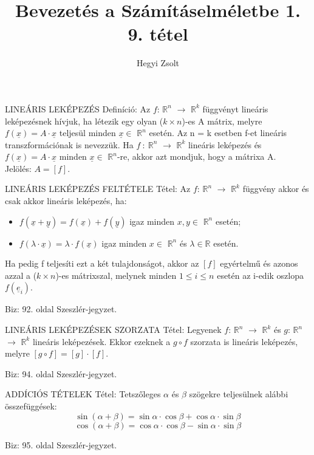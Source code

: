 \documentclass[]{article}
\title{Bevezetés a Számításelméletbe 1.\\{\large 9. tétel}}
\author{Hegyi Zsolt}
\newcommand{\R}{\mathbb{R}}
\newcommand{\Rn}[1]{$\mathbb{R}^{#1}$}
\newcommand{\Und}[1]{\underline{#1}}
\begin{document}
\maketitle{}
\begin{shaded}
LINEÁRIS LEKÉPEZÉS Definíció: Az $f$: \Rn{n} $\rightarrow$ \Rn{k} függvényt lineáris leképezésnek hívjuk, ha létezik egy olyan ($k \times n$)-es A mátrix, melyre $f(\Und{x}) = A \cdot \Und{x}$ teljesül minden $\Und{x} \in$ \Rn{n} esetén. Az n = k esetben f-et lineáris transzformációnak is nevezzük. Ha $f\::\:$\Rn{n} $\rightarrow$ \Rn{k} lineáris leképezés és $f(\Und{x}) = A \cdot \Und{x}$ minden $\Und{x} \in$ \Rn{n}-re, akkor azt mondjuk, hogy a mátrixa A.\\
Jelölés: $A = [f]$.
\end{shaded}
\begin{framed}
LINEÁRIS LEKÉPEZÉS FELTÉTELE Tétel: Az $f$: \Rn{n} $\rightarrow$ \Rn{k} függvény akkor és csak akkor lineáris leképezés, ha:
\begin{itemize}
\item $f(\Und{x} + \Und{y}) = f(\Und{x}) + f(\Und{y})$ igaz minden $x,y \in$ \Rn{n} esetén;
\item $f(\lambda \cdot \Und{x}) = \lambda \cdot f(\Und{x})$ igaz minden $x \in$ \Rn{n} és $\lambda \in \R$ esetén.
\end{itemize}
Ha pedig f teljesíti ezt a két tulajdonságot, akkor az $[f]$ egyértelmű és azonos azzal a ($k \times n$)-es mátrixszal, melynek minden $1 \leq i \leq n$ esetén az i-edik oszlopa $f(\Und{e}_i)$.
\end{framed}
\begin{leftbar}
Biz: 92. oldal Szeszlér-jegyzet.
\end{leftbar}
\begin{framed}
LINEÁRIS LEKÉPEZÉSEK SZORZATA Tétel: Legyenek $f$: \Rn{n} $\rightarrow$ \Rn{k} és $g$: \Rn{n} $\rightarrow$ \Rn{k} lineáris leképezések. Ekkor ezeknek a $g \circ f$ szorzata is lineáris leképezés, melyre $[g \circ f] = [g] \cdot [f]$.
\end{framed}
\begin{leftbar}
Biz: 94. oldal Szeszlér-jegyzet.
\end{leftbar}
\begin{framed}
ADDÍCIÓS TÉTELEK Tétel: Tetszőleges $\alpha$ és $\beta$ szögekre teljesülnek alábbi összefüggések:
$$\sin(\alpha + \beta) = \sin\alpha\cdot\cos\beta + \cos\alpha\cdot\sin\beta$$
$$\cos(\alpha + \beta) = \cos\alpha\cdot\cos\beta - \sin\alpha\cdot\sin\beta$$
\end{framed}
\begin{leftbar}
Biz: 95. oldal Szeszlér-jegyzet.
\end{leftbar}
\end{document}
